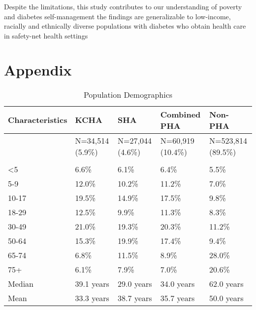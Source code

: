 \documentclass [11pt, proquest] {uwthesis}[2015/03/03]
\begin{document}
Despite the limitations, this study contributes to our understanding of
poverty and diabetes self-management the findings are generalizable to
low-income, racially and ethnically diverse populations with diabetes
who obtain health care in safety-net health settings

\appendix

\chapter{Appendix}\label{appendix}
\begin{table}

\caption{\label{tab:unnamed-chunk-1}Population Demographics}
\centering
\fontsize{12}{14}\selectfont
\begin{tabu} to 
\toprule
Characteristics & KCHA & SHA & Combined PHA & Non-PHA\\
\midrule
 & N=34,514 (5.9\%) & N=27,044  (4.6\%) & N=60,919  (10.4\%) & N=523,814 (89.5\%)\\
\addlinespace[0.3em]
\\
\hspace{1em}<5 & 6.6\% & 6.1\% & 6.4\% & 5.5\%\\
\hspace{1em}5-9 & 12.0\% & 10.2\% & 11.2\% & 7.0\%\\
\hspace{1em}10-17 & 19.5\% & 14.9\% & 17.5\% & 9.8\%\\
\hspace{1em}18-29 & 12.5\% & 9.9\% & 11.3\% & 8.3\%\\
\hspace{1em}30-49 & 21.0\% & 19.3\% & 20.3\% & 11.2\%\\
\hspace{1em}50-64 & 15.3\% & 19.9\% & 17.4\% & 9.4\%\\
\hspace{1em}65-74 & 6.8\% & 11.5\% & 8.9\% & 28.0\%\\
\hspace{1em}75+ & 6.1\% & 7.9\% & 7.0\% & 20.6\%\\
\hspace{1em}Median & 39.1 years & 29.0 years & 34.0 years & 62.0 years\\
\hspace{1em}Mean & 33.3 years & 38.7 years & 35.7 years & 50.0 years\\

\end{tabu}
\end{table}
\end{document}
